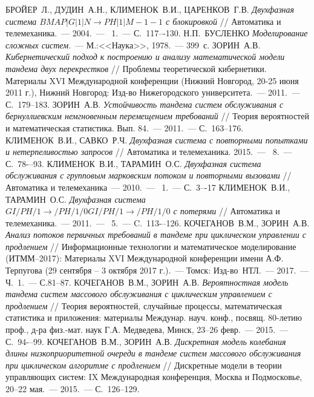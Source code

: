 \documentclass[11pt]{ubs}
\begin{document}
\begin{thebibliography}{100}
 \MakeUppercase{Бройер~Л., Дудин~А.Н., Клименок~В.И., Царенков~Г.В.} \textit{Двухфазная система $BMAP|G|1|N \to PH|1|M-1-1$ с блокировкой} // Автоматика и телемеханика.~--- 2004.~--- \No{}~1.~--- С.~117–-130.
 \MakeUppercase{Н.П.~Бусленко} \textit{Моделирование сложных систем}.~--- М.:<<Наука>>, 1978.~--- 399~с.
 \MakeUppercase{Зорин~А.В.} \textit{Кибернетический подход к построению и анализу математической модели тандема двух перекрестков} // Проблемы теоретической кибернетики. Материалы XVI Международной конференции (Нижний Новгород, 20-25 июня 2011 г.), Нижний Новгород: Изд-во Нижегородского университета.~--- 2011.~--- С.~179--183.
 \MakeUppercase{Зорин~А.В.} \textit{Устойчивость тандема систем обслуживания с бернуллиевским немгновенным перемещением требований} // Теория вероятностей и математическая статистика. Вып. 84.~--- 2011.~--- С.~163--176.
 \MakeUppercase{Клименок~В.И., Савко~Р.Ч. } \textit{Двухфазная система с повторными попытками и нетерпеливостью запросов} // Автоматика и телемеханика. 2015.~--- \No{}~8.~--- С.~78-–93. 
 \MakeUppercase{Клименок~В.И., Тарамин~О.С.} \textit{Двухфазная система обслуживания с групповым марковским потоком и повторными вызовами} // Автоматика и телемеханика~--- 2010.~--- \No~1.~--- С.~3–-17 
 \MakeUppercase{Клименок~В.И., Тарамин~О.С.} \textit{Двухфазная система $GI/PH/1 \to /PH/1/0GI/PH/1 \to /PH/1/0$ с потерями} // Автоматика и телемеханика.~--- 2011.~--- \No{}~5.~--- C.~113-–126.
 \MakeUppercase{Кочеганов~В.М., Зорин~А.В.} \textit{Анализ потоков первичных требований в тандеме при циклическом управлении с продлением} // Информационные технологии и математическое моделирование (ИТММ--2017): Материалы XVI Международной конференции имени А.Ф. Терпугова (29 сентября -- 3 октября 2017 г.).~--- Томск: Изд-во~НТЛ.~--- 2017.~--- Ч.~1.~--- С.81--87.
 \MakeUppercase{Кочеганов~В.М., Зорин~А.В.} \textit{Вероятностная модель тандема систем массового обслуживания с циклическим управлением с продлением} // Теория вероятностей, случайные процессы, математическая статистика и приложения: материалы Междунар. науч. конф., посвящ. 80-летию проф., д-ра физ.-мат. наук Г.А. Медведева, Минск, 23–26 февр.~--- 2015.~--- С.~94-–99.
 \MakeUppercase{Кочеганов~В.М., Зорин~А.В.} \textit{Дискретная модель колебания длины низкоприоритетной очереди в тандеме систем массового обслуживания при циклическом алгоритме с продлением} // Дискретные модели в теории управляющих систем: IX Международная конференция, Москва и Подмосковье, 20–22 мая.~--- 2015.~--- С.~126--129.

\end{thebibliography}
\end{document}

